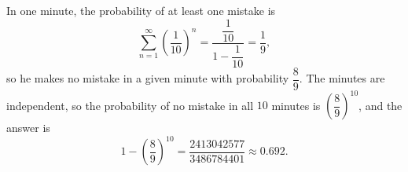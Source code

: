 In one minute, the probability of at least one mistake is
\[\sum_{n=1}^{\infty}\left(\dfrac{1}{10}\right)^n=\dfrac{\dfrac{1}{10}}{1-\dfrac{1}{10}}=\dfrac19,\]
so he makes no mistake in a given minute with probability $\dfrac89$. The minutes are independent, so the probability of no mistake in all $10$ minutes is $\left(\dfrac89\right)^{10}$, and the answer is
\[1-\left(\dfrac89\right)^{10}=\boxed{\dfrac{2413042577}{3486784401}}\approx0.692.\]
